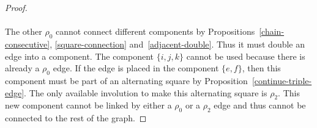 \begin{proof}
  \begin{figure}[H]
    \begin{center}
      \caption{}
    \end{center}
  \end{figure}

  \paragraph{}The other $\rho_0$ cannot connect different components by Propositions~\ref{chain-consecutive}, \ref{square-connection} and~\ref{adjacent-double}. Thus it must double an edge into a component. The component $\{i,j,k\}$ cannot be used because there is already a $\rho_0$ edge. If the edge is placed in the component $\{e,f\}$, then this component must be part of an alternating square by Proposition~\ref{continue-triple-edge}. The only available involution to make this alternating square is $\rho_2$. This new component cannot be linked by either a $\rho_0$ or a $\rho_2$ edge and thus cannot be connected to the rest of the graph.


\end{proof}
